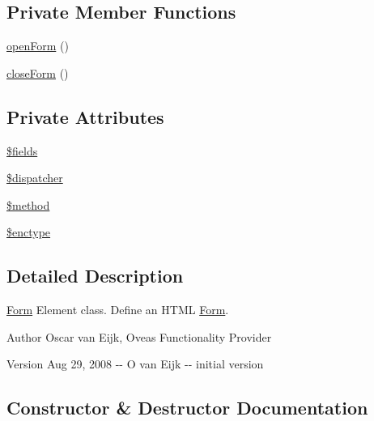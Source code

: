 \subsection*{Private Member Functions}
\begin{DoxyCompactItemize}
\item 
\hyperlink{classForm_a94902cc2869e1608247d9204036af7d1}{openForm} ()
\item 
\hyperlink{classForm_a9bb2df9ed7b866b0dc4b29b3874c2a1a}{closeForm} ()
\end{DoxyCompactItemize}
\subsection*{Private Attributes}
\begin{DoxyCompactItemize}
\item 
\hyperlink{classForm_abcb1c4022c2b93073a00ae65f3269d5b}{\$fields}
\item 
\hyperlink{classForm_ab02292e715af1dc9b0499dd20900aa92}{\$dispatcher}
\item 
\hyperlink{classForm_a3ca31ec7032a41b95c94de22a850672c}{\$method}
\item 
\hyperlink{classForm_a9c23b3ec186995d3df3ad6d4d5efc134}{\$enctype}
\end{DoxyCompactItemize}


\subsection{Detailed Description}
\hyperlink{classForm}{Form} Element class. Define an HTML \hyperlink{classForm}{Form}. \begin{DoxyAuthor}{Author}
Oscar van Eijk, Oveas Functionality Provider 
\end{DoxyAuthor}
\begin{DoxyVersion}{Version}
Aug 29, 2008 -\/-\/ O van Eijk -\/-\/ initial version 
\end{DoxyVersion}


\subsection{Constructor \& Destructor Documentation}
